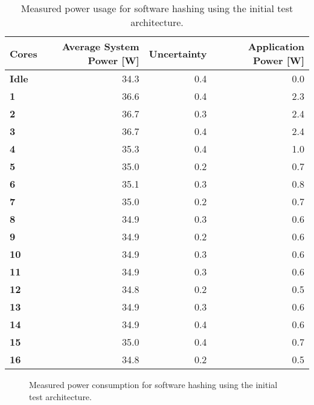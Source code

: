 \begin{appendix}
\begin{table}
\centering
\begin{tabular}{| l | r | r || r |}
  \hline 
  \textbf{Cores} & \textbf{Average System Power [W]} & \textbf{Uncertainty} & \textbf{Application Power [W]} \\
  \hline                       
  \textbf{Idle} &  34.3 & 0.4 & 0.0\\
  \textbf{1} &  36.6 & 0.4 & 2.3\\
  \textbf{2} &  36.7 & 0.3 & 2.4\\
  \textbf{3} &  36.7 & 0.4 & 2.4\\
  \textbf{4} &  35.3 & 0.4 & 1.0\\
  \textbf{5} &  35.0 & 0.2 & 0.7\\
  \textbf{6} &  35.1 & 0.3 & 0.8\\
  \textbf{7} &  35.0 & 0.2 & 0.7\\
  \textbf{8} &  34.9 & 0.3 & 0.6\\
  \textbf{9} &  34.9 & 0.2 & 0.6\\
  \textbf{10} &  34.9 & 0.3 & 0.6\\
  \textbf{11} &  34.9 & 0.3 & 0.6\\
  \textbf{12} &  34.8 & 0.2 & 0.5\\
  \textbf{13} &  34.9 & 0.3 & 0.6\\
  \textbf{14} &  34.9 & 0.4 & 0.6\\
  \textbf{15} &  35.0 & 0.4 & 0.7\\
  \textbf{16} &  34.8 & 0.2 & 0.5\\
  \hline 
\end{tabular}
\caption{Measured power usage for software hashing using the initial test architecture.}
\label{tab:SW-power1}
\end{table}

\begin{figure}
\centering
	\caption{Measured power consumption for software hashing using the initial test architecture.}
	\label{fig:SW-power1}
\end{figure}


\end{appendix}
